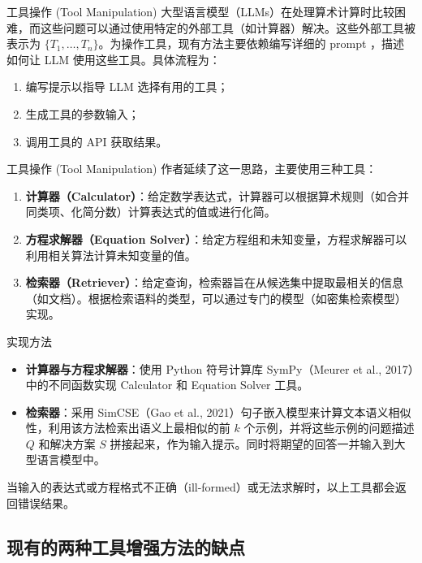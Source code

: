 \begin{frame}{工具操作 (Tool Manipulation)}
    大型语言模型（LLMs）在处理算术计算时比较困难，而这些问题可以通过使用特定的外部工具（如计算器）解决。这些外部工具被表示为 $\{T_1, \dots, T_n\}$。为操作工具，现有方法主要依赖编写详细的 prompt ，描述如何让 LLM 使用这些工具。具体流程为：
    \begin{enumerate}
        \item 编写提示以指导 LLM 选择有用的工具；
        \item 生成工具的参数输入；
        \item 调用工具的 API 获取结果。
    \end{enumerate}
\end{frame}
\begin{frame}{工具操作 (Tool Manipulation)}  
    作者延续了这一思路，主要使用三种工具：
    \begin{enumerate}
        \item \textbf{计算器（Calculator）}：给定数学表达式，计算器可以根据算术规则（如合并同类项、化简分数）计算表达式的值或进行化简。
        \item \textbf{方程求解器（Equation Solver）}：给定方程组和未知变量，方程求解器可以利用相关算法计算未知变量的值。
        \item \textbf{检索器（Retriever）}：给定查询，检索器旨在从候选集中提取最相关的信息（如文档）。根据检索语料的类型，可以通过专门的模型（如密集检索模型）实现。
    \end{enumerate}
\end{frame}

\begin{frame}{实现方法}
    \begin{itemize}
        \item \textbf{计算器与方程求解器}：使用 Python 符号计算库 SymPy（Meurer et al., 2017）中的不同函数实现 Calculator 和 Equation Solver 工具。
        \item \textbf{检索器}：采用 SimCSE（Gao et al., 2021）句子嵌入模型来计算文本语义相似性，利用该方法检索出语义上最相似的前 $k$ 个示例，并将这些示例的问题描述 $Q$ 和解决方案 $S$ 拼接起来，作为输入提示。同时将期望的回答一并输入到大型语言模型中。
    \end{itemize}
    
    当输入的表达式或方程格式不正确（ill-formed）或无法求解时，以上工具都会返回错误结果。
\end{frame}

\subsection{现有的两种工具增强方法的缺点}

